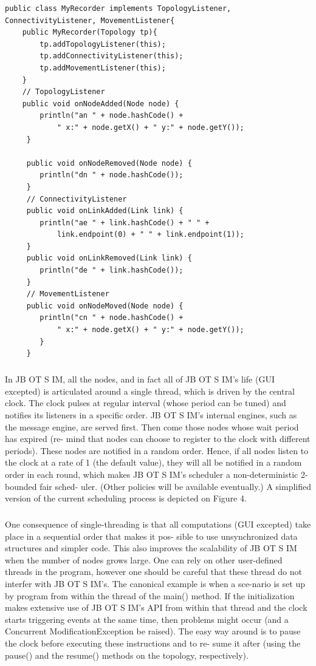 \begin{lstlisting}[caption=Centralized version of Random Waypoint, captionpos=b]
public class MyRecorder implements TopologyListener, ConnectivityListener, MovementListener{
	public MyRecorder(Topology tp){
		tp.addTopologyListener(this);
		tp.addConnectivityListener(this);
		tp.addMovementListener(this);
	}
	// TopologyListener
	public void onNodeAdded(Node node) {
	 	println("an " + node.hashCode() +
	 		" x:" + node.getX() + " y:" + node.getY());
	 }
	 
	 public void onNodeRemoved(Node node) {
	 	println("dn " + node.hashCode());
	 }
	 // ConnectivityListener
	 public void onLinkAdded(Link link) {
	 	println("ae " + link.hashCode() + " " +
	 		link.endpoint(0) + " " + link.endpoint(1));
	 }
	 public void onLinkRemoved(Link link) {
	 	println("de " + link.hashCode());
	 }
	 // MovementListener
	 public void onNodeMoved(Node node) {
	 	println("cn " + node.hashCode() +
	 		" x:" + node.getX() + " y:" + node.getY());
	 	}
	 }
\end{lstlisting}
\subparagraph{}In JB OT S IM, all the nodes, and in fact all of JB OT S IM’s life (GUI excepted) is articulated around a single thread, which is driven by the central clock. The clock pulses at regular interval (whose period can be tuned) and notifies its listeners in a specific order. JB OT S IM’s internal engines, such as the message engine, are served first. Then come those nodes whose wait period has expired (re- mind that nodes can choose to register to the clock with different periods). These nodes are notified in a random order. Hence, if all nodes listen to the clock at a rate of 1 (the default value), they will all be notified in a random order in each round, which makes JB OT S IM’s scheduler a non-deterministic 2-bounded fair sched- uler. (Other policies will be available eventually.) A simplified version of the current scheduling process is depicted on Figure 4.
\subparagraph{}One consequence of single-threading is that all computations (GUI excepted) take place in a sequential order that makes it pos- sible to use unsynchronized data structures and simpler code. This also improves the scalability of JB OT S IM when the number of nodes grows large. One can rely on other user-defined threads in the program, however one should be careful that these thread do not interfer with JB OT S IM’s. The canonical example is when a sce-nario is set up by program from within the thread of the main() method. If the initialization makes extensive use of JB OT S IM’s API from within that thread and the clock starts triggering events at the same time, then problems might occur (and a Concurrent ModificationException be raised). The easy way around is to pause the clock before executing these instructions and to re- sume it after (using the pause() and the resume() methods on the topology, respectively).
